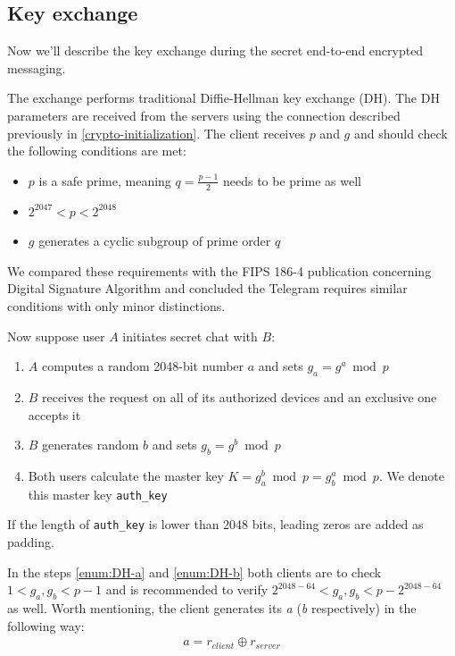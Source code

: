 \documentclass[thesis=M,english]{FITthesis}[2012/10/20]
\begin{document}
\subsection{Key exchange}\label{crypto-keyexchange}

Now we'll describe the key exchange during the secret end-to-end encrypted messaging.

The exchange performs traditional Diffie-Hellman key exchange (DH). The DH parameters are received from the servers using the connection described previously in \ref{crypto-initialization}. The client receives $p$ and $g$ and should check the following conditions are met:

\begin{itemize}
	\item $p$ is a safe prime, meaning $q = \frac{p-1}{2}$ needs to be prime as well
	\item $2^{2047} < p < 2^{2048}$
	\item $g$ generates a cyclic subgroup of prime order $q$
\end{itemize}

We compared these requirements with the FIPS 186-4 publication concerning Digital Signature Algorithm and concluded the Telegram requires similar conditions with only minor distinctions.

Now suppose user $A$ initiates secret chat with $B$:

\begin{enumerate}
	\item $A$ computes a random 2048-bit number $a$ and sets $g_a = g^a \bmod p$\label{enum:DH-a}
	\item $B$ receives the request on all of its authorized devices and an exclusive one accepts it
	\item $B$ generates random $b$ and sets $g_b = g^b \bmod p$\label{enum:DH-b}
	\item Both users calculate the master key $K = g_a^b \bmod p = g_b^a \bmod p$. We denote this master key \texttt{auth\_key}
\end{enumerate}

If the length of \texttt{auth\_key} is lower than 2048 bits, leading zeros are added as padding.

In the steps \ref{enum:DH-a} and \ref{enum:DH-b} both clients are to check $1 < g_a, g_b < p-1$ and is recommended to verify $2^{2048-64} < g_a, g_b < p - 2^{2048-64}$ as well. Worth mentioning, the client generates its \emph{a} (\emph{b} respectively) in the following way:
\begin{gather*}
a = r_{client} \oplus r_{server}
\end{gather*}
\end{document}
